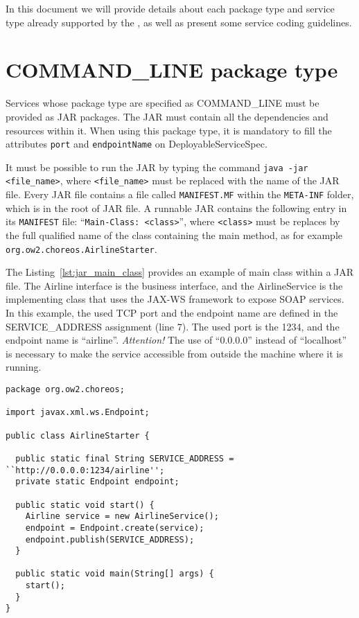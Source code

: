 In this document we will provide details about each package type and service type already supported by the \ee, as well as present some service coding guidelines. 

\section{COMMAND\_LINE package type}

Services whose package type are specified as COMMAND\_LINE must be provided as JAR packages. The JAR must contain all the dependencies and resources within it. When using this package type, it is mandatory to fill the attributes \texttt{port} and \texttt{endpointName} on \textsf{DeployableServiceSpec}.

It must be possible to run the JAR by typing the command \texttt{java -jar <file\_name>}, where \texttt{<file\_name>} must be replaced with the name of the JAR file. Every JAR file contains a file called \texttt{MANIFEST.MF} within the \texttt{META-INF} folder, which is in the root of JAR file. A runnable JAR contains the following entry in its \texttt{MANIFEST} file: ``\texttt{Main-Class: <class>}'', where \texttt{<class>} must be replaces by the full qualified name of the class containing the main method, as for example \texttt{org.ow2.choreos.AirlineStarter}.

The Listing~\ref{lst:jar_main_class} provides an example of main class within a JAR file. The \textsf{Airline} interface is the business interface, and the \textsf{AirlineService} is the implementing class that uses the JAX-WS framework to expose SOAP services. In this example, the used TCP port and the endpoint name are defined in the SERVICE\_ADDRESS assignment (line 7). The used port is the 1234, and the endpoint name is ``airline''. \emph{Attention!} The use of ``0.0.0.0'' instead of ``localhost'' is necessary to make the service accessible from outside the machine where it is running. 


\lstset{
language=Java,
numbers=left
}

{\footnotesize
\begin{lstlisting}[caption=Example of a class with the main method within a JAR file, label=lst:jar_main_class]
package org.ow2.choreos;

import javax.xml.ws.Endpoint;

public class AirlineStarter {

  public static final String SERVICE_ADDRESS = ``http://0.0.0.0:1234/airline'';
  private static Endpoint endpoint;
	
  public static void start() {
    Airline service = new AirlineService();
    endpoint = Endpoint.create(service);
    endpoint.publish(SERVICE_ADDRESS);
  }

  public static void main(String[] args) {	
    start();
  }
}
\end{lstlisting}
}

